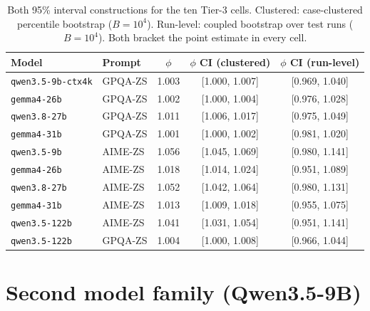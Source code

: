 \documentclass[a4paper,fleqn]{cas-sc}
\begin{document}
\begin{table}[t]
\centering
\caption{Both 95\% interval constructions for the ten Tier-3 cells.
Clustered: case-clustered percentile bootstrap ($B=10^4$). Run-level:
coupled bootstrap over test runs ($B=10^4$). Both bracket the point
estimate in every cell.}
\label{tab:ci}
\begin{tabular}{llccc}
\toprule
Model & Prompt & $\phi$ & $\phi$ CI (clustered) & $\phi$ CI (run-level) \\
\midrule
\texttt{qwen3.5-9b-ctx4k} & GPQA-ZS & 1.003 & [1.000, 1.007] & [0.969, 1.040] \\
\texttt{gemma4-26b} & GPQA-ZS & 1.002 & [1.000, 1.004] & [0.976, 1.028] \\
\texttt{qwen3.8-27b} & GPQA-ZS & 1.011 & [1.006, 1.017] & [0.975, 1.049] \\
\texttt{gemma4-31b} & GPQA-ZS & 1.001 & [1.000, 1.002] & [0.981, 1.020] \\
\texttt{qwen3.5-9b} & AIME-ZS & 1.056 & [1.045, 1.069] & [0.980, 1.141] \\
\texttt{gemma4-26b} & AIME-ZS & 1.018 & [1.014, 1.024] & [0.951, 1.089] \\
\texttt{qwen3.8-27b} & AIME-ZS & 1.052 & [1.042, 1.064] & [0.980, 1.131] \\
\texttt{gemma4-31b} & AIME-ZS & 1.013 & [1.009, 1.018] & [0.955, 1.075] \\
\texttt{qwen3.5-122b} & AIME-ZS & 1.041 & [1.031, 1.054] & [0.951, 1.141] \\
\texttt{qwen3.5-122b} & GPQA-ZS & 1.004 & [1.000, 1.008] & [0.966, 1.044] \\
\bottomrule
\end{tabular}
\end{table}

\section{Second model family (Qwen3.5-9B)}
\label{app:qwen}
\end{document}
